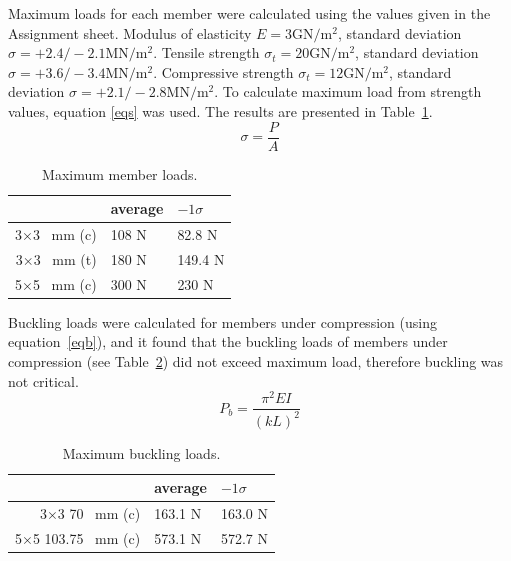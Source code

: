 \documentclass[12pt]{article}
\begin{document}
		Maximum loads for each member were calculated using the values given in the Assignment sheet. Modulus of elasticity $E=3\mathrm{GN}/\mathrm{m}^2$, standard deviation $\sigma=+2.4/-2.1\mathrm{MN}/\mathrm{m}^2$. Tensile strength $\sigma_t=20\mathrm{GN}/\mathrm{m}^2$,  standard deviation $\sigma=+3.6/-3.4\mathrm{MN}/\mathrm{m}^2$. Compressive strength $\sigma_t=12\mathrm{GN}/\mathrm{m}^2$,  standard deviation $\sigma=+2.1/-2.8\mathrm{MN}/\mathrm{m}^2$. To calculate maximum load from strength values, equation \ref{eqs} was used. The results are presented in Table~\ref{maxloads}.
		\begin{equation}
			\sigma=\frac{P}{A}
			\label{eqs}
		\end{equation}
		\begin{table}[h!]
			\caption{Maximum member loads.}
			\begin{center}
			\begin{tabular}{ | r | l | l | }
				\hline
				& average & $-1\sigma$ \\ \hline
				3$\times$3 ~mm (c) & 108 N & 82.8 N \\ \hline
				3$\times$3 ~mm (t) & 180 N & 149.4 N \\ \hline
				5$\times$5 ~mm (c) & 300 N & 230 N \\ \hline
			\end{tabular}
			\end{center}
			\label{maxloads}
		\end{table}

		Buckling loads were calculated for members under compression (using equation~\ref{eqb}), and it found that the buckling loads of members under compression (see Table~\ref{buck}) did not exceed maximum load, therefore buckling was not critical.
		\begin{equation}
			P_b=\frac{\pi^2 E I}{(kL)^2}
			\label{eqb}
		\end{equation}
		\begin{table}[h!]
			\caption{Maximum buckling loads.}
			\begin{center}
			\begin{tabular}{ | r | l | l | }
				\hline
				& average & $-1\sigma$ \\ \hline
				3$\times$3 70 ~mm (c) & 163.1 N & 163.0 N \\ \hline
				5$\times$5 103.75 ~mm (c) & 573.1 N & 572.7 N \\ \hline
			\end{tabular}
			\end{center}
			\label{buck}
		\end{table}
\end{document}
